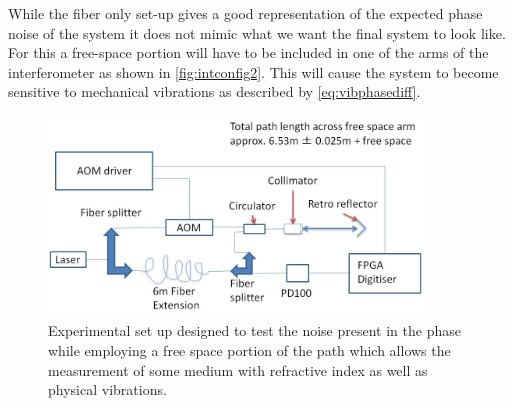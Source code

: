 \documentclass[12pt,a4paper,oneside]{report}
\begin{document}
While the fiber only set-up gives a good representation of the expected phase noise of the system it does not mimic what we want the final system to look like. For this a free-space portion will have to be included in one of the arms of the interferometer as shown in \autoref{fig:intconfig2}. This will cause the system to become sensitive to mechanical vibrations as described by \autoref{eq:vibphasediff}.


\begin{figure}[H] 
\includegraphics[width=0.9\textwidth, center,angle=0]{DImages/intconfig2.JPG}
\caption{Experimental set up designed to test the noise present in the phase while employing a free space portion of the path which allows the measurement of some medium with refractive index as well as physical vibrations.}
\label{fig:intconfig2}
\end{figure}
\end{document}
